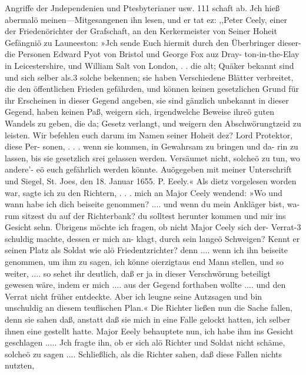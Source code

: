 Angriffe der Jndependenien und Ptesbyterianer usw. 111
schaft ab. Jch hieß abermalö meinen—Mitgesangenen ihn lesen,
und er tat ez:
,,Peter Ceely, einer der Friedenörichter der Grafschaft, an
den Kerkermeister von Seiner Hoheit Gefängniö zu Launeeston:
»Jch sende Euch hiermit durch den Überbringer dieser- die
Personen Edward Pyot von Bristol und George Fox auz Dray-
ton-in-the-Elay in Leicestershire, und William Salt von London, . .
die alt; Quäker bekannt sind und sich selber als.3 solche bekennen;
sie haben Verschiedene Blätter verbreitet, die den öffentlichen
Frieden gefährden, und können keinen gesetzlichen Grund für ihr
Erscheinen in dieser Gegend angeben, sie sind gänzlich unbekannt
in dieser Gegend, haben keinen Paß, weigern sich, irgendwelche
Beweise ihreö guten Wandels zu geben, die da; Gesetz verlangt,
und weigern den Abschwörungtzeid zu leisten. Wir befehlen euch
darum im Namen seiner Hoheit dez? Lord Protektor, diese Per-
sonen, . . . wenn sie kommen, in Gewahrsam zu bringen und da-
rin zu lassen, bis sie gesetzlich srei gelassen werden. Versäumet
nicht, solcheö zu tun, wo andere'- eö euch gefährlich werden könnte.
Auögegeben mit meiner Unterschrift und Siegel, St. Joes, den
18. Januar 1655. P. Eeely.«
Als dietz vorgelesen worden war, sagte ich zu den Richtern, . . .
mich an Major Ceely wendend: »Wo und wann habe ich dich
beiseite genommen? .... und wenn du mein Ankläger bist, wa-
rum sitzest du auf der Richterbank? du solltest herunter kommen
und mir ins Gesicht sehn. Übrigens möchte ich fragen, ob nicht
Major Ceely sich der- Verrat-3 schuldig machte, dessen er mich an-
klagt, durch sein langeö Schweigen? Kennt er seinen Platz als
Soldat wie alö Friedentzrichter? denn .... wenn ich ihn beiseite
genommen, um ihm zu sagen, ich könne oierzigtaus end Mann stellen,
und so weiter, .... so sehet ihr deutlich, daß er ja in dieser
Verschwörung beteiligt gewesen wäre, indem er mich .... aus
der Gegend forthaben wollte .... und den Verrat nicht früher
entdeckte. Aber ich leugne seine Autzsagen und bin unschuldig an
diesem teuflischen Plan.« Die Richter ließen nun die Sache fallen,
denn sie sahen daß, anstatt daß sie mich in eine Falle gelockt hatten,
ich selber ihnen eine gestellt hatte. Major Eeely behauptete nun,
ich habe ihm ins Gesicht geschlagen ..... Jch fragte ihn, ob er
sich alö Richter und Soldat nicht schäme, solcheö zu sagen ....
Schließlich, als die Richter sahen, daß diese Fallen nichts nutzten,


